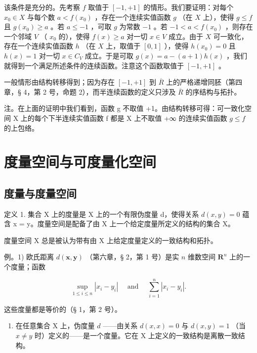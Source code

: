 该条件是充分的。先考察 \(f\) 取值于 \([-1, +1]\) 的情形。我们要证明：对每个 \(x_0 \in X\) 与每个数 \(a < f(x_0)\) ，存在一个连续实值函数 \(g\) （在 \(X\) 上），使得 \(g \leqslant f\) 且 \(g(x_0) \geqslant a\) 。若 \(a \leqslant -1\) ，可取 \(g\) 为常数 \(-1\) 。若 \(-1 < a < f(x_0)\) ，则存在一个邻域 \(V\) （ \(x_0\) 的），使得 \(f(x) \geqslant a\) 对一切 \(x \in V\) 成立。由于 \(X\) 可一致化，存在一个连续实值函数 \(h\) （在 \(X\) 上，取值于 \([0, 1]\) ），使得 \(h(x_0) = 0\) 且 \(h(x) = 1\) 对一切 \(x \in C_V\) 成立。于是可取 \(g(x) = a - (a + 1)h(x)\) ，我们就得到一个满足所述条件的连续函数。注意这个函数取值于 \([-1, +1]\) 。

一般情形由结构转移得到；因为存在 \([-1, +1]\) 到 \(\overline{R}\) 上的严格递增同胚（第四章，§ 4，第 2 号，命题 2），而半连续函数的定义只涉及 \(\overline{R}\) 的序结构与拓扑。

注。在上面的证明中我们看到，函数 g 不取值 +1。由结构转移可得：可一致化空间 X 上的每个下半连续实值函数 f 都是 X 上不取值 +∞ 的连续实值函数 \(g \leqslant f\) 的上包络。

\section{度量空间与可度量化空间}

\subsection{度量与度量空间}

定义 1. 集合 X 上的度量是 X 上的一个有限伪度量 d，使得关系 \(d(x, y) = 0\) 蕴含 x = y。度量空间是配备了由 X 上一个给定度量所定义的结构的集合 X。

度量空间 X 总是被认为带有由 X 上给定度量定义的一致结构和拓扑。

例。1) 欧氏距离 \(d(\pmb{x}, \pmb{y})\) （第六章，§ 2，第 1 号）是实 \(n\) 维数空间 \(\mathbf{R}^n\) 上的一个度量；函数

\[
\sup _ {1 \leqslant i \leqslant n} | x _ {i} - y _ {i} | \quad \text { and } \quad \sum_ {i = 1} ^ {n} | x _ {i} - y _ {i} |.
\]

这些度量都是等价的（§ 1，第 2 号）。

\begin{enumerate}
\def\labelenumi{\arabic{enumi})}
\setcounter{enumi}{1}
\tightlist
\item
  在任意集合 X 上，伪度量 \(d\) ——由关系 \(d(x, x) = 0\) 与 \(d(x, y) = 1\) （当 \(x \neq y\) 时）定义的——是一个度量。它在 X 上定义的一致结构是离散一致结构。
\end{enumerate}

